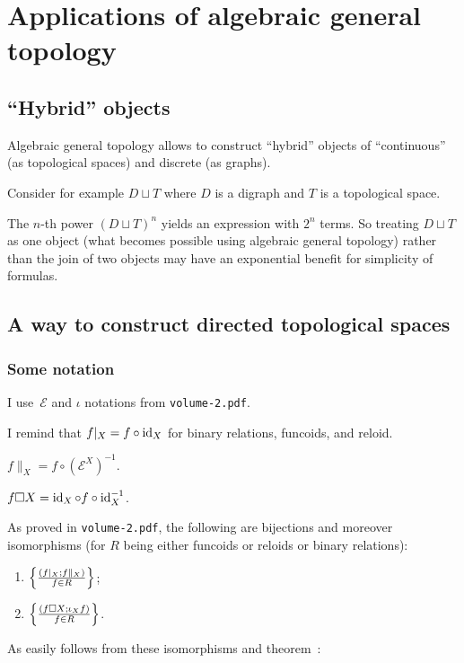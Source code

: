 \chapter{Applications of algebraic general topology}

\section{``Hybrid'' objects}

Algebraic general topology allows to construct ``hybrid'' objects of ``continuous'' (as topological spaces)
and discrete (as graphs).

Consider for example $D\sqcup T$ where $D$ is a digraph and $T$ is a topological space.

The $n$-th power $(D\sqcup T)^n$ yields an expression with $2^n$ terms.
So treating $D\sqcup T$ as one object (what becomes possible using algebraic general topology)
rather than the join of two objects may have an exponential benefit for simplicity of formulas.

\section{A way to construct directed topological spaces}

\subsection{Some notation}

I use~$\mathcal{E}$ and $\iota$ notations from {\tt volume-2.pdf}. 

I remind that $f|_X = f\circ \operatorname{id}_X$ for binary relations, funcoids, and reloid.

$f\parallel_X = f\circ(\mathcal{E}^X)^{-1}$.

$f\square X = \operatorname{id}_X\circ f\circ\operatorname{id}_X^{-1}$.

As proved in {\tt volume-2.pdf}, the following are bijections and moreover isomorphisms (for $R$ being either funcoids or reloids or binary relations):
\begin{enumerate}
\item $\left\{ \frac{(f|_X;f\parallel_X)}{f\in R}\right\}$;
\item $\left\{ \frac{(f\square X;\iota_X f)}{f\in R}\right\}$.
\end{enumerate}

As easily follows from these isomorphisms and theorem~:

